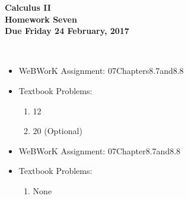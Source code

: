 \documentclass[12pt]{article}
\begin{document}
\pagestyle{empty}
 
\begin{center}
{\large {\bf Calculus II}}\\
\medskip
{\large {\bf Homework Seven}}\\
\medskip
{ {\bf Due Friday 24 February, 2017}}\\
\end{center}

 \\ 


\begin{itemize}
\setlength{\itemsep}{0mm}
\item WeBWorK Assignment: 07Chapters8.7and8.8
\item Textbook Problems:
  \begin{enumerate}
  \setlength{\itemsep}{-1mm}
    \item 12
    \item 20 (Optional)
  \end{enumerate}
\end{itemize}

\begin{itemize}
\setlength{\itemsep}{0mm}
\item WeBWorK Assignment: 07Chapter8.7and8.8
\item Textbook Problems:
  \begin{enumerate}
  \setlength{\itemsep}{-1mm}
    \item None
  \end{enumerate}
\end{itemize}

\end{document}
